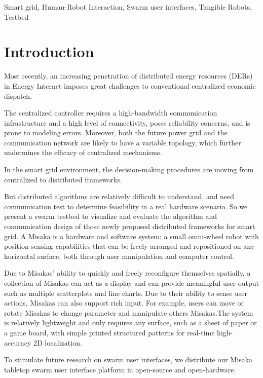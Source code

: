 \documentclass[conference]{IEEEtran}
\begin{document}
\begin{IEEEkeywords}
    Smart grid, Human-Robot Interaction, Swarm user interfaces, Tangible Robots, Testbed
\end{IEEEkeywords}

\section{Introduction}

Most recently, an increasing penetration of distributed energy resources (DERs) in Energy Internet imposes great challenges to conventional centralized economic dispatch\cite{yan2019consensus}.

The centralized controller requires a high-bandwidth communication infrastructure and a high level of connectivity, poses reliability concerns, and is prone to modeling errors. Moreover, both the future power grid and the communication network are likely to have a variable topology, which further undermines the efficacy of centralized mechanisms\cite{binetti2013distributed}.

In the smart grid environment, the decision-making procedures are moving from centralized to distributed frameworks\cite{yang2011communication}.

But distributed algorithms are relatively difficult to understand, and need communication test to determine feasibility in a real hardware scenario. So we present a swarm testbed to visualize and evaluate the algorithm and communication design of those newly proposed distributed frameworks for smart grid. A Misaka is a hardware and software system: a small omni-wheel robot with position sensing capabilities that can be freely arranged and repositioned on any horizontal surface, both through user manipulation and computer control. 

Due to Misakas’ ability to quickly and freely reconfigure themselves spatially, a collection of Misakas can act as a display and can provide meaningful user output such as multiple scatterplots and line charts. Due to their ability to sense user actions, Misakas can also support rich input. For example, users can move or rotate Misakas to change parameter and manipulate others Misakas.The system is relatively lightweight and only requires any surface, such as a sheet of paper or a game board, with simple printed structured patterns for real-time high-accuracy 2D localization.

To stimulate future research on swarm user interfaces, we distribute our Misaka tabletop swarm user interface platform in open-source and open-hardware.
\end{document}
